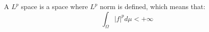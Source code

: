 \documentclass{article}
\begin{document}
\begin{theorem}{}
    A $L^p$ space is a space where $L^p$ norm is defined, which means that:
\begin{equation}
    \int_\Omega |f|^p d\mu<+\infty
\end{equation}
\end{theorem}
\end{document}
